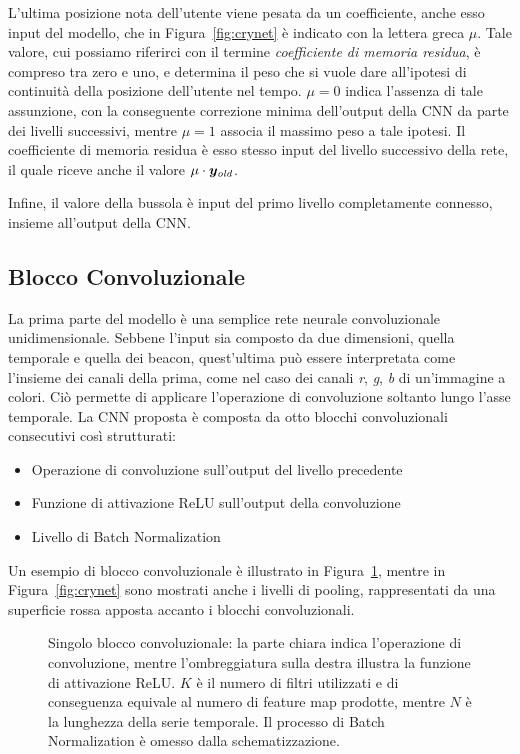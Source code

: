 L'ultima posizione nota dell'utente viene pesata da un coefficiente, anche esso
input del modello, che in Figura~\ref{fig:crynet} è indicato con la lettera
greca \(\mu\). Tale valore, cui possiamo riferirci con il termine
\emph{coefficiente di memoria residua}, è compreso tra zero e uno, e determina
il peso che si vuole dare all'ipotesi di continuità della posizione dell'utente
nel tempo. \(\mu = 0\) indica l'assenza di tale assunzione, con la conseguente
correzione minima dell'output della CNN da parte dei livelli successivi, mentre
\(\mu = 1 \) associa il massimo peso a tale ipotesi. Il coefficiente di memoria
residua è esso stesso input del livello successivo della rete, il quale riceve
anche il valore \(\mu \cdot \bm y_{\mathit{old}}\).

Infine, il valore della bussola è input del primo livello completamente connesso,
insieme all'output della CNN\@.
\subsection{Blocco Convoluzionale}
La prima parte del modello è una semplice rete neurale convoluzionale
unidimensionale. Sebbene l'input sia composto da due dimensioni, quella
temporale e quella dei beacon, quest'ultima può essere interpretata come
l'insieme dei canali della prima, come nel caso dei canali \emph{r}, \emph{g},
\emph{b} di un'immagine a colori. Ciò permette di applicare l'operazione di
convoluzione soltanto lungo l'asse temporale.  La CNN proposta è composta da
otto blocchi convoluzionali consecutivi così strutturati:
\begin{itemize}
    \item Operazione di convoluzione sull'output del livello precedente
    \item Funzione di attivazione ReLU sull'output della convoluzione
    \item Livello di Batch Normalization\cite{batchnorm}
\end{itemize}
Un esempio di blocco convoluzionale è illustrato in Figura~\ref{fig:cnnblock},
mentre in Figura~\ref{fig:crynet} sono mostrati anche i livelli di pooling,
rappresentati da una superficie rossa apposta accanto i blocchi convoluzionali.
\begin{figure}[htp]
  \caption{Singolo blocco convoluzionale: la parte chiara indica l'operazione
    di convoluzione, mentre l'ombreggiatura sulla destra illustra la funzione
    di attivazione ReLU\@. \(K\) è il numero di filtri utilizzati e di
    conseguenza equivale al numero di feature map prodotte, mentre \(N\) è la
    lunghezza della serie temporale. Il processo di Batch Normalization è
    omesso dalla schematizzazione.}%
  \label{fig:cnnblock}%
\end{figure}

